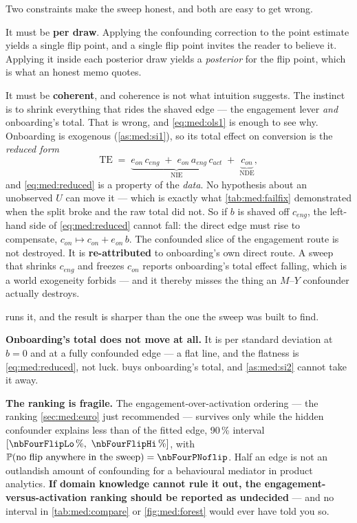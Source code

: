 Two constraints make the sweep honest, and both are easy to get wrong.

It must be \textbf{per draw}. Applying the confounding correction to the point estimate yields a
single flip point, and a single flip point invites the reader to believe it. Applying it inside each
posterior draw yields a \emph{posterior} for the flip point, which is what an honest memo quotes.

It must be \textbf{coherent}, and coherence is not what intuition suggests. The instinct is to shrink
everything that rides the shaved edge --- the engagement lever \emph{and} onboarding's total. That is
wrong, and \cref{eq:med:ols1} is enough to see why. Onboarding is exogenous
(\cref{as:med:si1}), so its total effect on conversion is the \emph{reduced form}
%
\begin{equation}
  \text{TE} \;=\; \underbrace{e_{on}\,c_{eng} \;+\; e_{on}\,a_{eng}\,c_{act}}_{\text{NIE}}
  \;+\; \underbrace{c_{on}}_{\text{NDE}},
  \label{eq:med:reduced}
\end{equation}
%
and \cref{eq:med:reduced} is a property of the \emph{data}. No hypothesis about an unobserved $U$ can
move it --- which is exactly what \cref{tab:med:failfix} demonstrated when the split broke and the
raw total did not. So if $b$ is shaved off $c_{eng}$, the left-hand side of \cref{eq:med:reduced}
cannot fall: the direct edge must rise to compensate, $c_{on} \mapsto c_{on} + e_{on}\,b$. The
confounded slice of the engagement route is not destroyed. It is \textbf{re-attributed} to
onboarding's own direct route. A sweep that shrinks $c_{eng}$ and freezes $c_{on}$ reports
onboarding's total effect falling, which is a world exogeneity forbids --- and it thereby misses the
thing an $M$--$Y$ confounder actually destroys.

 runs it, and the result is sharper than the one the sweep was built to find.



\textbf{Onboarding's total does not move at all.} It is \eur{\nbFourOnbValSweepStart} per standard
deviation at $b = 0$ and \eur{\nbFourOnbValSweepEnd} at a fully confounded edge --- a flat line, and
the flatness is \cref{eq:med:reduced}, not luck.  buys onboarding's total, and
\cref{as:med:si2} cannot take it away.

\textbf{The ranking is fragile.} The engagement-over-activation ordering --- the ranking
\cref{sec:med:euro} just recommended --- survives only while the hidden confounder explains less than
\pc{\nbFourFlipMed} of the fitted edge, 90\,\% interval $[\pc{\nbFourFlipLo},\ \pc{\nbFourFlipHi}]$,
with $\Prob(\text{no flip anywhere in the sweep}) = \nbFourPNoflip$. Half an edge is not an
outlandish amount of confounding for a behavioural mediator in product analytics. \textbf{If domain
knowledge cannot rule it out, the engagement-versus-activation ranking should be reported as
undecided} --- and no interval in \cref{tab:med:compare} or \cref{fig:med:forest} would ever have
told you so.

